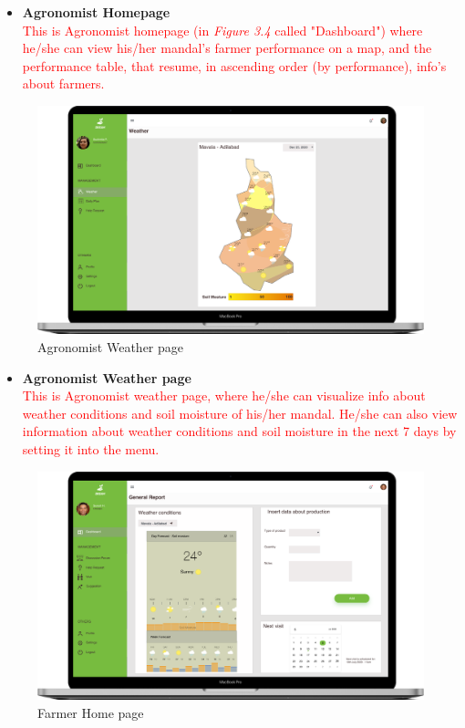 \begin{itemize}
    \item \textbf{Agronomist Homepage}\\ 
    \textcolor{red}{This is Agronomist homepage (in \textit{Figure 3.4} called "Dashboard") where he/she can view his/her mandal's farmer performance on a map, and the performance table, that resume, in ascending order (by performance), info's about farmers.}
\end{itemize}


\begin{figure}[H]
  \includegraphics[width=140mm,scale=0.9]{./Images//Mocks/WebApp/Agronomist_Weather.png}
  \caption{Agronomist Weather page}
\end{figure}

\begin{itemize}
    \item \textbf{Agronomist Weather page}\\ 
    \textcolor{red}{This is Agronomist weather page, where he/she can visualize info about weather conditions and soil moisture of his/her mandal. He/she can also view information about weather conditions and soil moisture in the next 7 days by setting it into the menu.}
\end{itemize}


\begin{figure}[H]
  \includegraphics[width=140mm,scale=0.9]{./Images//Mocks/WebApp/Farmer_Home.png}
  \caption{Farmer Home page}
\end{figure}


